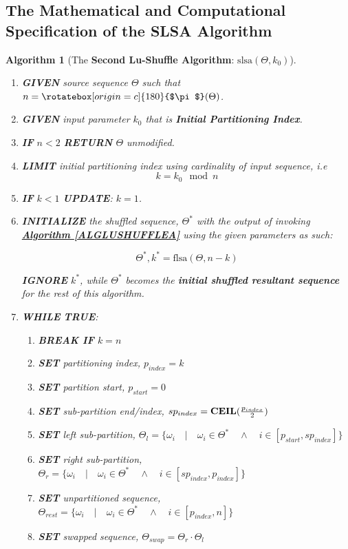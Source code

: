 \documentclass[a4paper, 18pt]{book} %
\newtheorem{alg}{Algorithm}
\newcommand{\invpi}{\rotatebox[origin=c]{180}{$\pi$}}
\begin{document}
\subsection{The Mathematical and Computational Specification of the SLSA Algorithm}

\begin{alg}[The \textbf{Second Lu-Shuffle Algorithm}: $\text{slsa}(\Theta, k_0)$]
\label{ALGLUSHUFFLEB}
$ $\\
\begin{enumerate}
\item \textbf{GIVEN} source sequence $\Theta$ such that $n = \invpi(\Theta)$.
\item  \textbf{GIVEN} input parameter $k_0$ that is \textbf{Initial Partitioning Index}.
\item \textbf{IF} $n < 2$ \textbf{RETURN} $\Theta$ unmodified.
\item {\textbf{LIMIT} initial partitioning index using cardinality of input sequence, i.e
\begin{equation}
k = k_0 \mod n
\end{equation}
}
\item \textbf{IF} $k < 1$ \textbf{UPDATE}: $k = 1$.
\item{  \textbf{INITIALIZE} the shuffled sequence, $\Theta^*$ with the output of invoking \textbf{\hyperref[ALGLUSHUFFLEA]{Algorithm \ref{ALGLUSHUFFLEA}}} using the given parameters as such:

		\begin{equation}
		\label{EQIPI}
		\Theta^*,k^* = \text{flsa}(\Theta, n - k)
		\end{equation}
		
		\textbf{IGNORE} $k^*$, while $\Theta^*$ becomes the \textbf{initial shuffled resultant sequence} for the rest of this algorithm.
}
\item { \textbf{WHILE} \textbf{TRUE}:
\begin{enumerate}
	\item \textbf{BREAK IF} $k = n$
	\item \textbf{SET} partitioning index, $p_{index} = k$
	\item \textbf{SET} partition start, $p_{start} = 0$
	\item \textbf{SET} sub-partition end/index, $sp_{index} = \text{\textbf{CEIL}}(\frac{p_{index}}{2})$
	\item \textbf{SET} left sub-partition, $\Theta_{l} = \{\omega_i \quad|\quad \omega_i \in \Theta^* \quad \land \quad i \in [p_{start},sp_{index}]\}$
	\item \textbf{SET} right sub-partition, $\Theta_{r} = \{\omega_i \quad|\quad \omega_i \in \Theta^* \quad \land \quad i \in [sp_{index},p_{index}]\}$
	\item \textbf{SET} unpartitioned sequence, $\Theta_{rest} = \{\omega_i \quad|\quad \omega_i \in \Theta^* \quad \land \quad i \in [p_{index},n]\}$
	\item \textbf{SET} swapped sequence, $\Theta_{swap} = \Theta_{r} \cdot \Theta_{l}$ 
	

\end{enumerate}}
\end{enumerate}
\end{alg}
\end{document}
